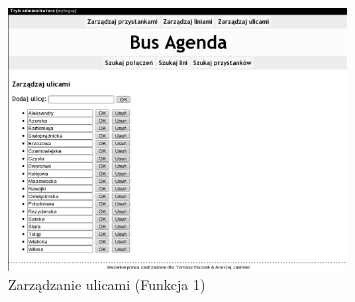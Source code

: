 \begin{figure}[!htp]
    \centering
    \includegraphics[width=0.8\textwidth]{./img/screens/manageStreets_main.eps}
    \caption{Zarządzanie ulicami (Funkcja 1)}
    \label{fig:adminMain}
\end{figure}